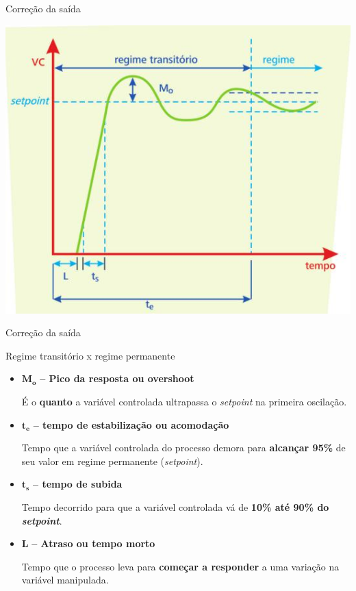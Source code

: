 \begin{frame}{Correção da saída}
	
	\centering
	\includegraphics[width=0.7\linewidth]{Figuras/Ch11/fig10}
	
\end{frame}


\begin{frame}{Correção da saída}
	\begin{block}{Regime transitório x regime permanente}
		\begin{itemize}
			\item $ \bm{M_o} $ \textbf{-- Pico da resposta ou overshoot}
			
			É o \textbf{quanto} a variável controlada ultrapassa o \textit{setpoint} na primeira oscilação.
			\item $ \bm{t_e} $ \textbf{-- tempo de estabilização ou acomodação}
			
			Tempo que a variável controlada do processo demora para \textbf{alcançar 95\%} de seu valor em regime permanente (\textit{setpoint}).
			\item $ \bm{t_s} $ \textbf{-- tempo de subida}
			
			Tempo decorrido para que a variável controlada vá de \textbf{10\% até 90\% do \textit{setpoint}}.
			\item $ \bm{L} $ \textbf{-- Atraso ou tempo morto}
			
			Tempo que o processo leva para \textbf{começar a responder} a uma variação na variável manipulada.
		\end{itemize}
	\end{block}
\end{frame}




